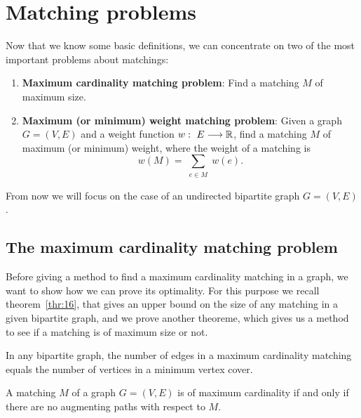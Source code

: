 \section{Matching problems}
\label{sec:matprob}

Now that we know some basic definitions, we can
concentrate on two of the most important problems about
matchings:
\begin{enumerate}
   \item \textbf{Maximum cardinality matching problem}:
    Find a matching $M$ of maximum size.
   \item \textbf{Maximum (or minimum) weight matching problem}:
   Given a graph $G=(V,E)$ and a weight function 
   $w:~E\longrightarrow\mathbb{R}$, find a matching $M$ of maximum
   (or minimum) weight, where the weight of a matching is
   \begin{displaymath}
        w(M) = \sum_{\substack{e \in M}}  w(e). 
   \end{displaymath}
\end{enumerate}

From now we will focus on the case of an undirected bipartite 
graph $G=(V,E)$.

\subsection{The maximum cardinality matching problem}
\label{subsec:maxcarmat}

Before giving a method to find a maximum cardinality matching
in a graph, we want to show how we can prove its optimality. 
For this purpose we recall theorem~\ref{thr:16}, that gives
an upper bound on the size of any matching in a given bipartite
graph, and we prove another theoreme, which gives us a method
to see if a matching is of maximum size or not.

\begin{theorem}
   In any bipartite graph, the number of edges in a 
   maximum cardinality matching equals the number of vertices in 
   a minimum vertex cover. 
\end{theorem}

\begin{theorem}
   A matching $M$ of a graph $G=(V,E)$ is of maximum 
   cardinality if and only if there are no augmenting paths
   with respect to $M$.
\end{theorem}

